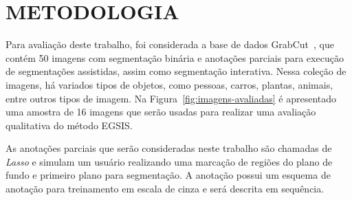 \chapter{METODOLOGIA}\label{cap:metodologia}

Para avaliação deste trabalho, foi considerada a base de dados
GrabCut~\cite{rother2004grabcut}, que contém 50 imagens com
segmentação binária e anotações parciais para execução de segmentações
assistidas, assim como segmentação interativa. Nessa
coleção de imagens, há variados tipos de objetos, como pessoas,
carros, plantas, animais, entre outros tipos de imagem. Na Figura~\ref{fig:imagens-avaliadas} é
apresentado uma amostra de 16 imagens que serão usadas para realizar
uma avaliação qualitativa do método EGSIS.\@

\begin{figure}[h!]
        \captionsetup{width=16cm}
		\centering
        {}
\end{figure}
\FloatBarrier{}

As anotações parciais que serão consideradas neste trabalho são
chamadas de \textit{Lasso} e simulam um usuário realizando uma
marcação de regiões do plano de fundo e primeiro plano para
segmentação. A anotação possui um esquema de anotação para treinamento
em escala de cinza e será descrita em sequência.

